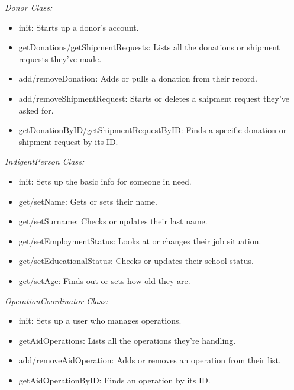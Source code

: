 \documentclass[a4paper,12pt]{report}
\begin{document}
				\textit{Donor Class:} 
			\begin{itemize}
				
		\item	init: Starts up a donor's account.
		\item	getDonations/getShipmentRequests: Lists all the donations or shipment requests they've made.
		\item	add/removeDonation: Adds or pulls a donation from their record.
		\item	add/removeShipmentRequest: Starts or deletes a shipment request they've asked for.
		\item	getDonationByID/getShipmentRequestByID: Finds a specific donation or shipment request by its ID.
				
			\end{itemize}
				\textit{IndigentPerson Class:} 
			\begin{itemize}
				\item	init: Sets up the basic info for someone in need.
				\item	get/setName: Gets or sets their name.
				\item	get/setSurname: Checks or updates their last name.
				\item	get/setEmploymentStatus: Looks at or changes their job situation.
				\item	get/setEducationalStatus: Checks or updates their school status.
				\item	get/setAge: Finds out or sets how old they are.
			\end{itemize}
			
				\textit{OperationCoordinator Class:} 
			\begin{itemize}
			\item	init: Sets up a user who manages operations.
			\item	getAidOperations: Lists all the operations they’re handling.
			\item	add/removeAidOperation: Adds or removes an operation from their list.
			\item	getAidOperationByID: Finds an operation by its ID.
			
			\end{itemize}
			
			
			
\end{document}
